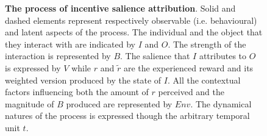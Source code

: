 \begin{figure}[h]
\begin{center}
\begin{adjustbox}{width=0.7\columnwidth}
    \end{adjustbox}
  \end{center}
\caption{\textbf{The process of incentive salience attribution}. Solid and dashed elements represent respectively observable (i.e. behavioural) and latent aspects of the process. The individual and the object that they interact with are indicated by $I$ and $O$. The strength of the interaction is represented by $B$. The salience that $I$ attributes to $O$ is expressed by $V$ while $r$ and $\tilde{r}$ are the experienced reward and its weighted version produced by the state of $I$. All the contextual factors influencing both the amount of $r$ perceived and the magnitude of $B$ produced are represented by $Env$. The dynamical natures of the process is expressed though the arbitrary temporal unit $t$.}
\label{fig: incs}
\end{figure}